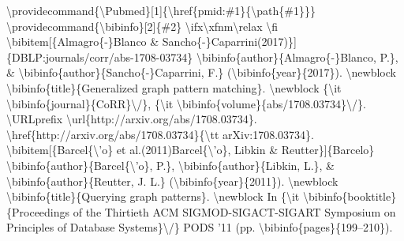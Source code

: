 \documentclass{article}%
\begin{document}
\textbackslash{}providecommand\{\textbackslash{}Pubmed\}{[}1{]}\{\textbackslash{}href\{pmid:\#1\}\{\textbackslash{}path\{\#1\}\}\}\newline%
\textbackslash{}providecommand\{\textbackslash{}bibinfo\}{[}2{]}\{\#2\}\newline%
\textbackslash{}ifx\textbackslash{}xfnm\textbackslash{}relax \textbackslash{}fi\newline%
\textbackslash{}bibitem{[}\{Almagro\{{-}\}Blanco \&\newline%
Sancho\{{-}\}Caparrini(2017)\}{]}\{DBLP:journals/corr/abs{-}1708{-}03734\}\newline%
\textbackslash{}bibinfo\{author\}\{Almagro\{{-}\}Blanco, P.\}, \& \textbackslash{}bibinfo\{author\}\{Sancho\{{-}\}Caparrini,\newline%
F.\} (\textbackslash{}bibinfo\{year\}\{2017\}).\newline%
\textbackslash{}newblock \textbackslash{}bibinfo\{title\}\{Generalized graph pattern matching\}.\newline%
\textbackslash{}newblock \{\textbackslash{}it \textbackslash{}bibinfo\{journal\}\{CoRR\}\textbackslash{}/\}, \{\textbackslash{}it\newline%
\textbackslash{}bibinfo\{volume\}\{abs/1708.03734\}\textbackslash{}/\}. \textbackslash{}URLprefix\newline%
\textbackslash{}url\{http://arxiv.org/abs/1708.03734\}.\newline%
\textbackslash{}href\{http://arxiv.org/abs/1708.03734\}\{\textbackslash{}tt arXiv:1708.03734\}.\newline%
\textbackslash{}bibitem{[}\{Barcel\{\textbackslash{}'o\} et al.(2011)Barcel\{\textbackslash{}'o\}, Libkin \& Reutter\}{]}\{Barcelo\}\newline%
\textbackslash{}bibinfo\{author\}\{Barcel\{\textbackslash{}'o\}, P.\}, \textbackslash{}bibinfo\{author\}\{Libkin, L.\}, \&\newline%
\textbackslash{}bibinfo\{author\}\{Reutter, J. L.\} (\textbackslash{}bibinfo\{year\}\{2011\}).\newline%
\textbackslash{}newblock \textbackslash{}bibinfo\{title\}\{Querying graph patterns\}.\newline%
\textbackslash{}newblock In \{\textbackslash{}it \textbackslash{}bibinfo\{booktitle\}\{Proceedings of the Thirtieth ACM\newline%
SIGMOD{-}SIGACT{-}SIGART Symposium on Principles of Database Systems\}\textbackslash{}/\} PODS '11\newline%
(pp. \textbackslash{}bibinfo\{pages\}\{199–210\}).\newline%
\end{document}
